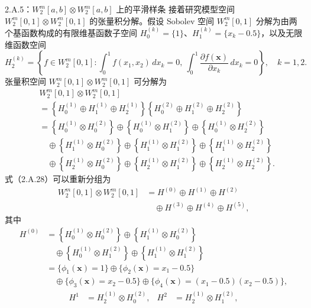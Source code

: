 \begin{bookexample}{2.A.5：$W_2^m[a,b]\otimes W_2^m[a,b]$ 上的平滑样条}
接着研究模型空间 $W_2^m[0,1]\otimes W_2^m[0,1]$ 的张量积分解。假设 Sobolev 空间 $W_2^m[0,1]$ 分解为由两个基函数构成的有限维基函数子空间 $H_0^{(k)}=\{1\}$、$H_1^{(k)}=\{x_k-0.5\}$，以及无限维函数空间
\[
H_2^{(k)}=\left\{f\in W_2^m[0,1]:
 \int_0^1f(x_1,x_2)\,dx_k=0,\
 \int_0^1\frac{\partial f(\boldsymbol x)}{\partial x_k}\,dx_k=0\right\},
\quad k=1,2.
\]
张量积空间 $W_2^m[0,1]\otimes W_2^m[0,1]$ 可分解为
\begin{equation}
\begin{aligned}
&W_2^m[0,1]\otimes W_2^m[0,1]\\
&=\left\{H_0^{(1)}\oplus H_1^{(1)}\oplus H_2^{(1)}\right\}
 \left\{H_0^{(2)}\oplus H_1^{(2)}\oplus H_2^{(2)}\right\}\\
&=\left\{H_0^{(1)}\otimes H_0^{(2)}\right\}
 \oplus\left\{H_0^{(1)}\otimes H_1^{(2)}\right\}
 \oplus\left\{H_0^{(1)}\otimes H_2^{(2)}\right\}\\
&\quad\oplus\left\{H_1^{(1)}\otimes H_0^{(2)}\right\}
 \oplus\left\{H_1^{(1)}\otimes H_1^{(2)}\right\}
 \oplus\left\{H_1^{(1)}\otimes H_2^{(2)}\right\}\\
&\quad\oplus\left\{H_2^{(1)}\otimes H_0^{(2)}\right\}
 \oplus\left\{H_2^{(1)}\otimes H_1^{(2)}\right\}
 \oplus\left\{H_2^{(1)}\otimes H_2^{(2)}\right\}.
\end{aligned}\tag{2.A.108}
\end{equation}
式（2.A.28）可以重新分组为
\begin{equation}
\begin{aligned}
W_2^m[0,1]\otimes W_2^m[0,1]
 &=H^{(0)}\oplus H^{(1)}\oplus H^{(2)}\\
 &\quad\oplus H^{(3)}\oplus H^{(4)}\oplus H^{(5)},
\end{aligned}\tag{2.A.109}
\end{equation}
其中
\[
\begin{aligned}
H^{(0)}
 &=\left\{H_0^{(1)}\otimes H_0^{(2)}\right\}
 \oplus\left\{H_1^{(1)}\otimes H_0^{(2)}\right\}\\
 &\quad\oplus\left\{H_0^{(1)}\otimes H_1^{(2)}\right\}
 \oplus\left\{H_1^{(1)}\otimes H_1^{(2)}\right\}\\
 &=\{\phi_1(\boldsymbol x)=1\}
 \oplus\{\phi_2(\boldsymbol x)=x_1-0.5\}\\
 &\quad\oplus\{\phi_3(\boldsymbol x)=x_2-0.5\}
 \oplus\{\phi_4(\boldsymbol x)=(x_1-0.5)(x_2-0.5)\},
\end{aligned}
\]
\[
\begin{aligned}
H^1&=H_2^{(1)}\otimes H_0^{(2)},&
H^2&=H_2^{(1)}\otimes H_1^{(2)},\\

\end{aligned}\]
\end{bookexample}
